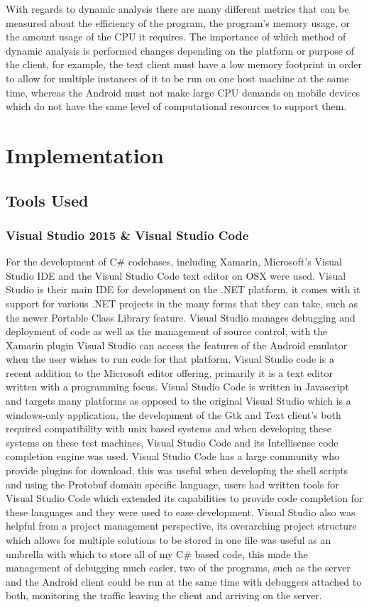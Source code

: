 \documentclass{article}
\begin{document}
With regards to dynamic analysis there are many different metrics that can be measured about the efficiency of the program, the program's memory usage, or the amount usage of the CPU it requires. The importance of which method of dynamic analysis is performed changes depending on the platform or purpose of the client, for example, the text client must have a low memory footprint in order to allow for multiple instances of it to be run on one host machine at the same time, whereas the Android must not make large CPU demands on mobile devices which do not have the same level of computational resources to support them. 

\section{Implementation}
\subsection{Tools Used}

\subsubsection{Visual Studio 2015 \& Visual Studio Code}
For the development of C\# codebases, including Xamarin, Microsoft’s Visual Studio IDE and the Visual Studio Code text editor on OSX were used. Visual Studio is their main IDE for development on the .NET platform, it comes with it support for various .NET projects in the many forms that they can take, such as the newer Portable Class Library feature. Visual Studio manages debugging and deployment of code as well as the management of source control, with the Xamarin plugin Visual Studio can access the features of the Android emulator when the user wishes to run code for that platform. Visual Studio code is a recent addition to the Microsoft editor offering, primarily it is a text editor written with a programming focus. Visual Studio Code is written in Javascript and targets many platforms as opposed to the original Visual Studio which is a windows-only application, the development of the Gtk and Text client’s both required compatibility with unix based systems and when developing these systems on these test machines, Visual Studio Code and its Intellisense code completion engine was used. Visual Studio Code has a large community who provide plugins for download, this was useful when developing the shell scripts and using the Protobuf domain specific language, users had written tools for Visual Studio Code which extended its capabilities to provide code completion for these languages and they were used to ease development. Visual Studio also was helpful from a project management perspective, its overarching project structure which allows for multiple solutions to be stored in one file was useful as an umbrella with which to store all of my C\# based code, this made the management of debugging much easier, two of the programs, such as the server and the Android client could be run at the same time with debuggers attached to both, monitoring the traffic leaving the client and arriving on the server.
\end{document}
